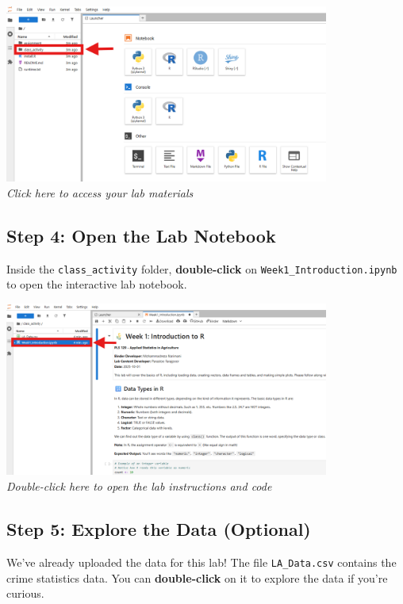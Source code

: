 \documentclass[11pt,a4paper]{article}
\begin{document}
\begin{center}
\includegraphics[width=0.8\textwidth]{../Image_3.png}\\
\textit{Click here to access your lab materials}
\end{center}

\subsection{Step 4: Open the Lab Notebook}

Inside the \texttt{class\_activity} folder, \textbf{double-click} on \texttt{Week1\_Introduction.ipynb} to open the interactive lab notebook.

\begin{center}
\includegraphics[width=0.8\textwidth]{../Image_4.png}\\
\textit{Double-click here to open the lab instructions and code}
\end{center}

\subsection{Step 5: Explore the Data (Optional)}

We've already uploaded the data for this lab! The file \texttt{LA\_Data.csv} contains the crime statistics data. You can \textbf{double-click} on it to explore the data if you're curious.
\end{document}

